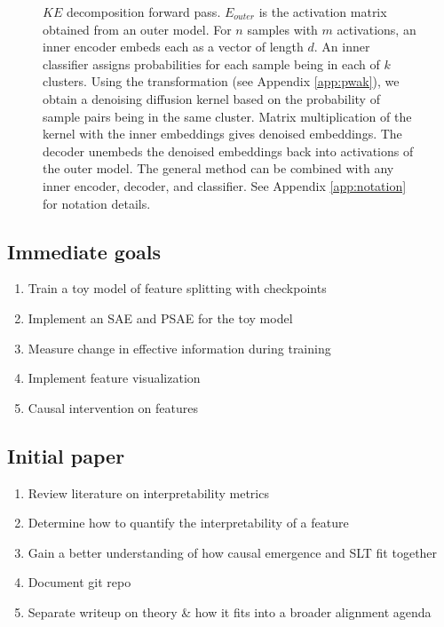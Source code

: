\begin{figure}
    \centering
        
     
     \caption{
     $KE$ decomposition forward pass. 
     $E_{outer}$ is the activation matrix obtained from an outer model.
     For $n$ samples with $m$ activations, an inner encoder embeds each as a vector of length $d$.
     An inner classifier assigns probabilities for each sample being in each of $k$ clusters.
     Using the \PWAK transformation (see Appendix \ref{app:pwak}), 
     we obtain a denoising diffusion kernel based on the probability of sample pairs being in the same cluster.
     Matrix multiplication of the kernel with the inner embeddings gives denoised embeddings.
     The decoder unembeds the denoised embeddings back into activations of the outer model.
     The general method can be combined with any inner encoder, decoder, and classifier.
     See Appendix \ref{app:notation} for notation details.
     }
     \label{fig:deepwak}
\end{figure}

\subsection{Immediate goals}
\begin{enumerate}
    \item Train a toy model of feature splitting with checkpoints
    \item Implement an SAE and PSAE for the toy model
    \item Measure change in effective information during training
    \item Implement feature visualization
    \item Causal intervention on features
\end{enumerate}

\subsection{Initial paper}
\begin{enumerate}
    \item Review literature on interpretability metrics
    \item Determine how to quantify the interpretability of a feature
    \item Gain a better understanding of how causal emergence and SLT fit together
    \item Document git repo
    \item Separate writeup on theory \& how it fits into a broader alignment agenda
\end{enumerate}

